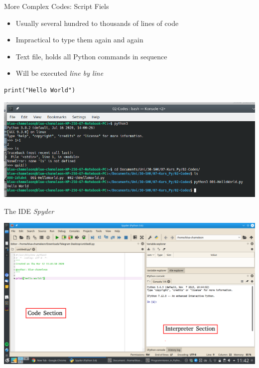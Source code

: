 \begin{frame}[fragile]{More Complex Codes: Script Fiels}
%
\begin{minipage}[t]{.29\linewidth}
\vspace{0pt}
\begin{itemize}
\item Usually several hundred to thousands of lines of code
\item Impractical to type them again and again
\item[\Thus] Text file, holds all Python commands in sequence
\item Will be executed \emph{line by line}
\end{itemize}
\end{minipage}
%
%
\begin{minipage}[t]{.69\linewidth}
\vspace{0pt}
\begin{codebox}
\begin{verbatim}
print("Hello World")
\end{verbatim}
\end{codebox}
\includegraphics[width=\linewidth]{./gfx/print-HelloWorld-Run}
\end{minipage}
%
\end{frame}


\begin{frame}[fragile]{The IDE \emph{Spyder}}
%
\begin{center}
\includegraphics[width=.8\linewidth]{./gfx/Spyder}
\end{center}
%
\end{frame}

